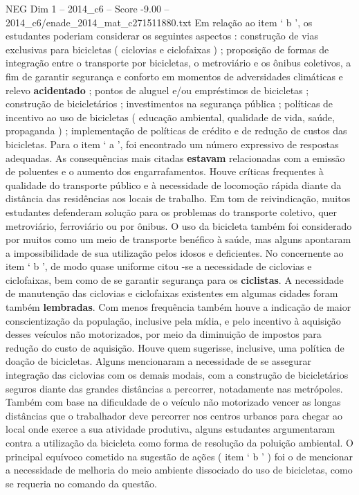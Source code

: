 \begin{textsample}{NEG Dim 1 – 2014\_c6 – Score -9.00 – 2014\_c6/enade\_2014\_mat\_c271511880.txt}
Em relação ao item ‘ b ’, os estudantes poderiam considerar os seguintes aspectos : construção de vias exclusivas para bicicletas ( ciclovias e ciclofaixas ) ; proposição de formas de integração entre o transporte por bicicletas, o metroviário e os ônibus coletivos, a fim de garantir segurança e conforto em momentos de adversidades climáticas e relevo \textbf{acidentado} ; pontos de aluguel e/ou empréstimos de bicicletas ; construção de bicicletários ; investimentos na segurança pública ; políticas de incentivo ao uso de bicicletas ( educação ambiental, qualidade de vida, saúde, propaganda ) ; implementação de políticas de crédito e de redução de custos das bicicletas.
Para o item ‘ a ’, foi encontrado um número expressivo de respostas adequadas.
As consequências mais citadas \textbf{estavam} relacionadas com a emissão de poluentes e o aumento dos engarrafamentos.
Houve críticas frequentes à qualidade do transporte público e à necessidade de locomoção rápida diante da distância das residências aos locais de trabalho.
Em tom de reivindicação, muitos estudantes defenderam solução para os problemas do transporte coletivo, quer metroviário, ferroviário ou por ônibus.
O uso da bicicleta também foi considerado por muitos como um meio de transporte benéfico à saúde, mas alguns apontaram a impossibilidade de sua utilização pelos idosos e deficientes.
No concernente ao item ‘ b ’, de modo quase uniforme citou -se a necessidade de ciclovias e ciclofaixas, bem como de se garantir segurança para os \textbf{ciclistas}.
A necessidade de manutenção das ciclovias e ciclofaixas existentes em algumas cidades foram também \textbf{lembradas}.
Com menos frequência também houve a indicação de maior conscientização da população, inclusive pela mídia, e pelo incentivo à aquisição desses veículos não motorizados, por meio da diminuição de impostos para redução do custo de aquisição.
Houve quem sugerisse, inclusive, uma política de doação de bicicletas.
Alguns mencionaram a necessidade de se assegurar integração das ciclovias com os demais modais, com a construção de bicicletários seguros diante das grandes distâncias a percorrer, notadamente nas metrópoles.
Também com base na dificuldade de o veículo não motorizado vencer as longas distâncias que o trabalhador deve percorrer nos centros urbanos para chegar ao local onde exerce a sua atividade produtiva, alguns estudantes argumentaram contra a utilização da bicicleta como forma de resolução da poluição ambiental.
O principal equívoco cometido na sugestão de ações ( item ‘ b ’ ) foi o de mencionar a necessidade de melhoria do meio ambiente dissociado do uso de bicicletas, como se requeria no comando da questão.

\end{textsample}
